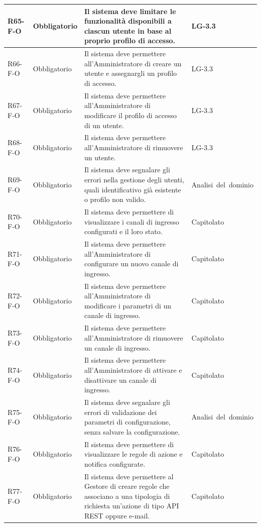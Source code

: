 {\begin{longtable}{|>{\raggedright\arraybackslash}p{1.8cm}|>{\raggedright\arraybackslash}p{2.3cm}|>{\raggedright\arraybackslash}p{6.6cm}|>{\raggedright\arraybackslash}p{3.1cm}|}
    \mbox{R65-F-O} & Obbligatorio & Il sistema deve limitare le funzionalità disponibili a ciascun utente in base al proprio profilo di accesso. & \mbox{LG-3.3} \\ \hline
    \mbox{R66-F-O} & Obbligatorio & Il sistema deve permettere all'Amministratore di creare un utente e assegnargli un profilo di accesso. & \mbox{LG-3.3} \\ \hline
    \mbox{R67-F-O} & Obbligatorio & Il sistema deve permettere all'Amministratore di modificare il profilo di accesso di un utente. & \mbox{LG-3.3} \\ \hline
    \mbox{R68-F-O} & Obbligatorio & Il sistema deve permettere all'Amministratore di rimuovere un utente. & \mbox{LG-3.3} \\ \hline
    \mbox{R69-F-O} & Obbligatorio & Il sistema deve segnalare gli errori nella gestione degli utenti, quali identificativo già esistente o profilo non valido. & \mbox{Analisi del dominio} \\ \hline
    \mbox{R70-F-O} & Obbligatorio & Il sistema deve permettere di visualizzare i canali di ingresso configurati e il loro stato. & \mbox{Capitolato} \\ \hline
    \mbox{R71-F-O} & Obbligatorio & Il sistema deve permettere all'Amministratore di configurare un nuovo canale di ingresso. & \mbox{Capitolato} \\ \hline
    \mbox{R72-F-O} & Obbligatorio & Il sistema deve permettere all'Amministratore di modificare i parametri di un canale di ingresso. & \mbox{Capitolato} \\ \hline
    \mbox{R73-F-O} & Obbligatorio & Il sistema deve permettere all'Amministratore di rimuovere un canale di ingresso. & \mbox{Capitolato} \\ \hline
    \mbox{R74-F-O} & Obbligatorio & Il sistema deve permettere all'Amministratore di attivare e disattivare un canale di ingresso. & \mbox{Capitolato} \\ \hline
    \mbox{R75-F-O} & Obbligatorio & Il sistema deve segnalare gli errori di validazione dei parametri di configurazione, senza salvare la configurazione. & \mbox{Analisi del dominio} \\ \hline
    \mbox{R76-F-O} & Obbligatorio & Il sistema deve permettere di visualizzare le regole di azione e notifica configurate. & \mbox{Capitolato} \\ \hline
    \mbox{R77-F-O} & Obbligatorio & Il sistema deve permettere al Gestore di creare regole che associano a una tipologia di richiesta un'azione di tipo API REST oppure e-mail. & \mbox{Capitolato} \\ \hline

\end{longtable}}
